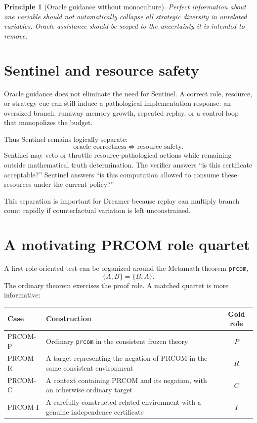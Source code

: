 \documentclass[11pt]{article}
\newtheorem{principle}[definition]{Principle}
\begin{document}
\begin{principle}[Oracle guidance without monoculture]
Perfect information about one variable should not automatically collapse all strategic diversity in unrelated variables. Oracle assistance should be scoped to the uncertainty it is intended to remove.
\end{principle}

\section{Sentinel and resource safety}

Oracle guidance does not eliminate the need for Sentinel. A correct role, resource, or strategy cue can still induce a pathological implementation response: an oversized branch, runaway memory growth, repeated replay, or a control loop that monopolizes the budget.

Thus Sentinel remains logically separate:
\begin{equation}
\text{oracle correctness}\not\Rightarrow\text{resource safety}.
\end{equation}
Sentinel may veto or throttle resource-pathological actions while remaining outside mathematical truth determination. The verifier answers ``is this certificate acceptable?'' Sentinel answers ``is this computation allowed to consume these resources under the current policy?''

This separation is important for Dreamer because replay can multiply branch count rapidly if counterfactual variation is left unconstrained.

\section{A motivating PRCOM role quartet}

A first role-oriented test can be organized around the Metamath theorem \texttt{prcom},
\begin{equation}
\{A,B\}=\{B,A\}.
\end{equation}
The ordinary theorem exercises the proof role. A matched quartet is more informative:

\begin{center}
\begin{tabular}{p{}p{}c}
\toprule
Case & Construction & Gold role \\
\midrule
PRCOM-P & Ordinary \texttt{prcom} in the consistent frozen theory & $P$ \\
PRCOM-R & A target representing the negation of PRCOM in the same consistent environment & $R$ \\
PRCOM-C & A context containing PRCOM and its negation, with an otherwise ordinary target & $C$ \\
PRCOM-I & A carefully constructed related environment with a genuine independence certificate & $I$ \\
\bottomrule
\end{tabular}
\end{center}
\end{document}
